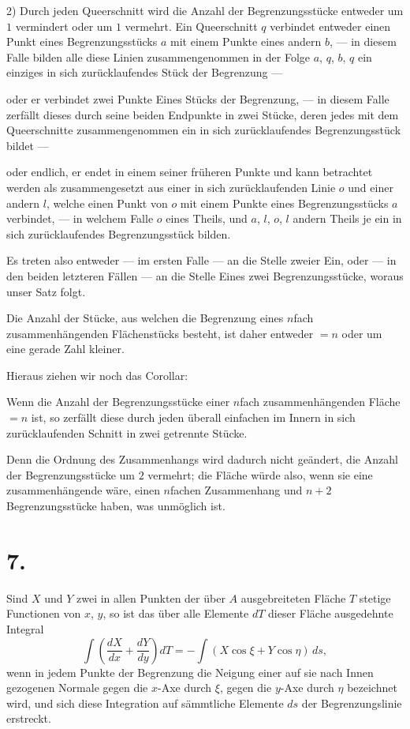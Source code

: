 \documentclass{article}
\begin{document}
2) Durch jeden Queerschnitt wird die Anzahl der Begrenzungsstücke entweder um $1$ vermindert oder um $1$ vermehrt.
Ein Queerschnitt $q$ verbindet entweder einen Punkt eines Begrenzungsstücks $a$ mit einem Punkte eines andern $b$, --- in diesem Falle bilden alle diese Linien zusammengenommen in der Folge $a$, $q$, $b$, $q$ ein einziges in sich zurücklaufendes Stück der Begrenzung ---

oder er verbindet zwei Punkte Eines Stücks der Begrenzung, --- in diesem Falle zerfällt dieses durch seine beiden Endpunkte in zwei Stücke, deren jedes mit dem Queerschnitte zusammengenommen ein in sich zurücklaufendes Begrenzungsstück bildet ---

oder endlich, er endet in einem seiner früheren Punkte und kann betrachtet werden als zusammengesetzt aus einer in sich zurücklaufenden Linie $o$ und einer andern $l$, welche einen Punkt von $o$ mit einem Punkte eines Begrenzungsstücks $a$ verbindet, --- in welchem Falle $o$ eines Theils, und $a$, $l$, $o$, $l$ andern Theils je ein in sich zurücklaufendes Begrenzungsstück bilden.

Es treten also entweder --- im ersten Falle --- an die Stelle zweier Ein, oder --- in den beiden letzteren Fällen --- an die Stelle Eines zwei Begrenzungsstücke, woraus unser Satz folgt.

Die Anzahl der Stücke, aus welchen die Begrenzung eines $n$fach zusammenhängenden Flächenstücks besteht, ist daher entweder $= n$ oder um eine gerade Zahl kleiner.

Hieraus ziehen wir noch das Corollar:

Wenn die Anzahl der Begrenzungsstücke einer $n$fach zusammenhängenden Fläche $= n$ ist, so zerfällt diese durch jeden überall einfachen im Innern in sich zurücklaufenden Schnitt in zwei getrennte Stücke.

Denn die Ordnung des Zusammenhangs wird dadurch nicht geändert, die Anzahl der Begrenzungsstücke um $2$ vermehrt; die Fläche würde also, wenn sie eine zusammenhängende wäre, einen $n$fachen Zusammenhang und $n+2$ Begrenzungsstücke haben, was unmöglich ist.

\section*{7.}

Sind $X$ und $Y$ zwei in allen Punkten der über $A$ ausgebreiteten Fläche $T$ stetige Functionen von $x$, $y$, so ist das über alle Elemente $dT$ dieser Fläche ausgedehnte Integral
\[
\int \left(\frac{dX}{dx} + \frac{dY}{dy}\right) dT = -\int (X\cos\xi + Y\cos\eta)\,ds,
\]
wenn in jedem Punkte der Begrenzung die Neigung einer auf sie nach Innen gezogenen Normale gegen die $x$-Axe durch $\xi$, gegen die $y$-Axe durch $\eta$ bezeichnet wird, und sich diese Integration auf sämmtliche Elemente $ds$ der Begrenzungslinie erstreckt.
\end{document}

